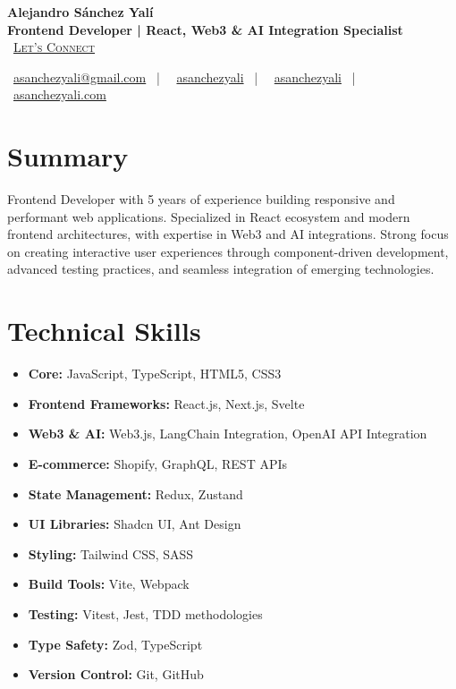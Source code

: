 \documentclass[letterpaper,11pt]{article}
\begin{document}
\begin{center}
\textbf{\Huge Alejandro Sánchez Yalí}\\[0.3em]
\textbf{\Large Frontend Developer | React, Web3 \& AI Integration Specialist}\\[0.5em]
\small
\faCalendar\ \href{https://cal.com/asanchezyali/full-time-opportunities}{\textsc{Let's Connect}}

\vspace{1em}
\faEnvelope\ \href{mailto:asanchezyali@gmail.com}{asanchezyali@gmail.com}  ~|~
\faLinkedin\ \href{https://www.linkedin.com/in/asanchezyali}{asanchezyali} ~|~
\faGithub\ \href{https://github.com/asanchezyali}{asanchezyali}  ~|~
\faGlobe\ \href{https://asanchezyali.com}{asanchezyali.com}
\end{center}

\section{Summary}
Frontend Developer with 5 years of experience building responsive and performant web applications. Specialized in React ecosystem and modern frontend architectures, with expertise in Web3 and AI integrations. Strong focus on creating interactive user experiences through component-driven development, advanced testing practices, and seamless integration of emerging technologies.

\section{Technical Skills}
\begin{itemize}[leftmargin=*]
  \item \textbf{Core:} JavaScript, TypeScript, HTML5, CSS3
  \item \textbf{Frontend Frameworks:} React.js, Next.js, Svelte
  \item \textbf{Web3 \& AI:} Web3.js, LangChain Integration, OpenAI API Integration
  \item \textbf{E-commerce:} Shopify, GraphQL, REST APIs
  \item \textbf{State Management:} Redux, Zustand
  \item \textbf{UI Libraries:} Shadcn UI, Ant Design
  \item \textbf{Styling:} Tailwind CSS, SASS
  \item \textbf{Build Tools:} Vite, Webpack
  \item \textbf{Testing:} Vitest, Jest, TDD methodologies
  \item \textbf{Type Safety:} Zod, TypeScript
  \item \textbf{Version Control:} Git, GitHub
\end{itemize}
\end{document}
